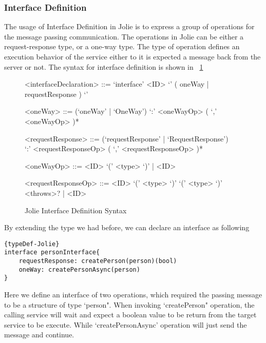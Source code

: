 \subsubsection{Interface Definition}
\label{sec:jolie-interface-def}

The usage of Interface Definition in Jolie is to express a group of operations for the message passing communication. The operations in Jolie can be either a request-response type, or a one-way type. The type of operation defines an execution behavior of the service either to it is expected a message back from the server or not. The syntax for interface definition is shown in ~\ref{fig:InterfaceDefinitonSyntax}

\begin{figure}[h]
	\begin{framed}
		\begin{grammar}
			<interfaceDeclaration> ::= `interface' <ID> `{' ( oneWay | requestResponse ) `}'

			<oneWay> ::= (`oneWay' | `OneWay')  `:' <oneWayOp> ( `,' <oneWayOp> )*

			<requestResponse> ::= (`requestResponse' | `RequestResponse') \\ `:' <requestResponseOp> ( `,' <requestResponseOp> )*

			<oneWayOp> ::= <ID> `(' <type> `)' | <ID>

			<requestResponseOp> ::= <ID> `(' <type> `)' `(' <type> `)' <throws>? | <ID>

		\end{grammar}
	\end{framed}
	\caption{Jolie Interface Definition Syntax\protect\footnotemark}
	\label{fig:InterfaceDefinitonSyntax}
\end{figure}


By extending the type we had before, we can declare an interface as following
\begin{listing}[h]

\lstset{language=Jolie,
	style=codeStyle
}
\begin{lstlisting}[frame=tlrb, caption= {Jolie Interface declaration example} ]{typeDef-Jolie}
interface personInterface{
	requestResponse: createPerson(person)(bool)
	oneWay: createPersonAsync(person)
}
\end{lstlisting}
\end{listing}

Here we define an interface of two operations, which required the passing message to be a structure of type `person". When invoking `createPerson" operation, the calling service will wait and expect a boolean value to be return from the target service to be execute. While `createPersonAsync' operation will just send the message and continue.

\FloatBarrier
